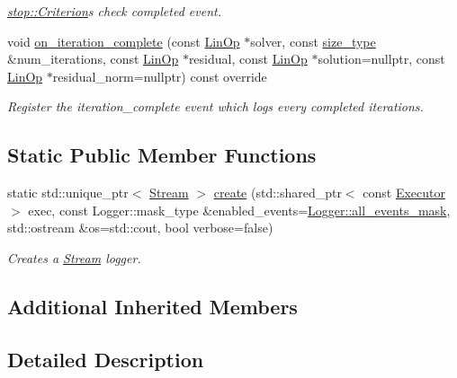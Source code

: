 \begin{DoxyCompactItemize}
\begin{DoxyCompactList}\small\item\em \hyperlink{classgko_1_1stop_1_1Criterion}{stop\+::\+Criterion}\textquotesingle{}s check completed event. \end{DoxyCompactList}\item 
void \hyperlink{classgko_1_1log_1_1Stream_a80953e058d3b63f1d931712368aec630}{on\+\_\+iteration\+\_\+complete} (const \hyperlink{classgko_1_1LinOp}{Lin\+Op} $\ast$solver, const \hyperlink{namespacegko_a6e5c95df0ae4e47aab2f604a22d98ee7}{size\+\_\+type} \&num\+\_\+iterations, const \hyperlink{classgko_1_1LinOp}{Lin\+Op} $\ast$residual, const \hyperlink{classgko_1_1LinOp}{Lin\+Op} $\ast$solution=nullptr, const \hyperlink{classgko_1_1LinOp}{Lin\+Op} $\ast$residual\+\_\+norm=nullptr) const override
\begin{DoxyCompactList}\small\item\em Register the {\ttfamily iteration\+\_\+complete} event which logs every completed iterations. \end{DoxyCompactList}\end{DoxyCompactItemize}
\subsection*{Static Public Member Functions}
\begin{DoxyCompactItemize}
\item 
static std\+::unique\+\_\+ptr$<$ \hyperlink{classgko_1_1log_1_1Stream}{Stream} $>$ \hyperlink{classgko_1_1log_1_1Stream_a71f96d3f1cd7c03875476cd8db98145b}{create} (std\+::shared\+\_\+ptr$<$ const \hyperlink{classgko_1_1Executor}{Executor} $>$ exec, const Logger\+::mask\+\_\+type \&enabled\+\_\+events=\hyperlink{classgko_1_1log_1_1Logger_a02534863a2d2f92dfeb2c39038365532}{Logger\+::all\+\_\+events\+\_\+mask}, std\+::ostream \&os=std\+::cout, bool verbose=false)
\begin{DoxyCompactList}\small\item\em Creates a \hyperlink{classgko_1_1log_1_1Stream}{Stream} logger. \end{DoxyCompactList}\end{DoxyCompactItemize}
\subsection*{Additional Inherited Members}


\subsection{Detailed Description}
